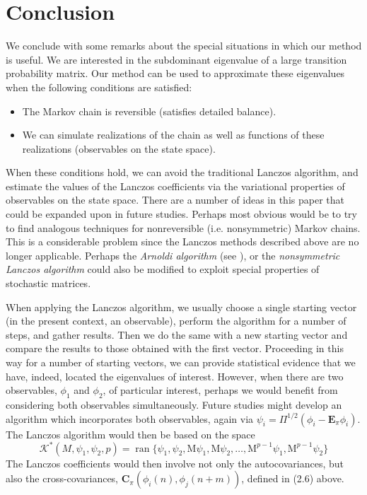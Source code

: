 \documentclass[12pt,letterpaper]{report}
\theoremstyle{plain}
\theoremstyle{definition}
\theoremstyle{remark}
\numberwithin{theorem}{chapter}
\numberwithin{claim}{chapter}
\numberwithin{equation}{chapter}
\numberwithin{conjecture}{chapter}
\newcommand\sK{\ensuremath{\mathcal{K}}}
\newcommand\bC{\ensuremath{\mathbf{C}}}
\newcommand\M{\ensuremath{\mathrm{M}}}
\newcommand\bE{\ensuremath{\mathbf{E}}}
\newcommand\ran{\ensuremath{\operatorname{ran}}}
\newcommand\<{\ensuremath{\langle}}
\renewcommand\>{\ensuremath{\rangle}}
\begin{document}
\chapter{Conclusion}
\label{cha:conclusion}
We conclude with some remarks about the special situations in which our
method is useful.
We are interested in the subdominant eigenvalue of a large transition probability matrix. Our
method can be used to approximate these eigenvalues when the following conditions are satisfied:
\begin{itemize}
\item 
The Markov chain is reversible (satisfies detailed balance).
\item
We can simulate realizations of the chain as well as functions of these
realizations (observables on the state space).
\end{itemize}
When these conditions hold, we can avoid the traditional Lanczos algorithm, and
estimate the values of the Lanczos coefficients via the variational properties of
observables on the state space. 
There are a number of ideas in this paper that could be expanded upon in future
studies.  Perhaps most obvious would be to try to find analogous techniques for
nonreversible (i.e. nonsymmetric) Markov chains. This is a considerable problem
since the Lanczos methods described above are no longer applicable. Perhaps the
\emph{Arnoldi algorithm} (see \cite[Algorithm 6.9]{Demmel:1997}), or the
\emph{nonsymmetric Lanczos algorithm} could also be modified to exploit
special properties of stochastic matrices. %
%
%
%
%

When applying the Lanczos algorithm, we usually choose a single starting vector (in the
present context, an observable), perform the algorithm for a number of steps, and gather results.
Then we do the same with a new starting vector and compare the results to those obtained with
the first vector. Proceeding in this way for a number of starting vectors, we can provide statistical
evidence that we have, indeed, located the eigenvalues of interest. However, when there are two
observables, $\phi_1$ and $\phi_2$, of particular interest, perhaps we would
benefit from considering both observables simultaneously. Future studies might
develop an algorithm which incorporates both observables, 
again via $\psi_i = \Pi^{1/2}(\phi_i - \bE_{\pi}\phi_i)$. %
The Lanczos algorithm would then be based on the space 
\[
\sK^*(M,\psi_1, \psi_2, p) =  \ran\{\psi_1, \psi_2, \M\psi_1, 
\M\psi_2, \dots, \M^{p-1}\psi_1, \M^{p-1}\psi_2\}
\]
The Lanczos coefficients would then involve not only the autocovariances,
but also the cross-covariances, 
$\bC_\pi(\phi_i(n), \phi_j(n+m))$, defined in (2.6) above.
\end{document}
